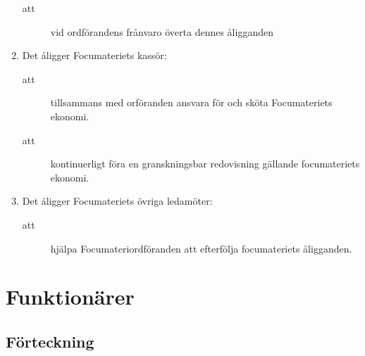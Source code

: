 \documentclass[11pt,a4paper]{article}
\begin{document}
\begin{enumerate}[\thesubsection .1]
\begin{description}
      \item[att] vid ordförandens frånvaro överta dennes åligganden
      
    \end{description}


  \item Det åligger Focumateriets kassör:
    \begin{description}
      \item[att] tillsammans med orföranden ansvara för och sköta Focumateriets ekonomi.
      \item[att] kontinuerligt föra en granskningsbar redovisning gällande focumateriets ekonomi.
    \end{description}

  \item Det åligger Focumateriets övriga ledamöter:
    \begin{description}
      \item[att] hjälpa Focumateriordföranden att efterfölja focumateriets åligg\-and\-en.
    \end{description}

\end{enumerate}

\newpage

\section{Funktionärer}

\subsection{Förteckning}
\end{document}

